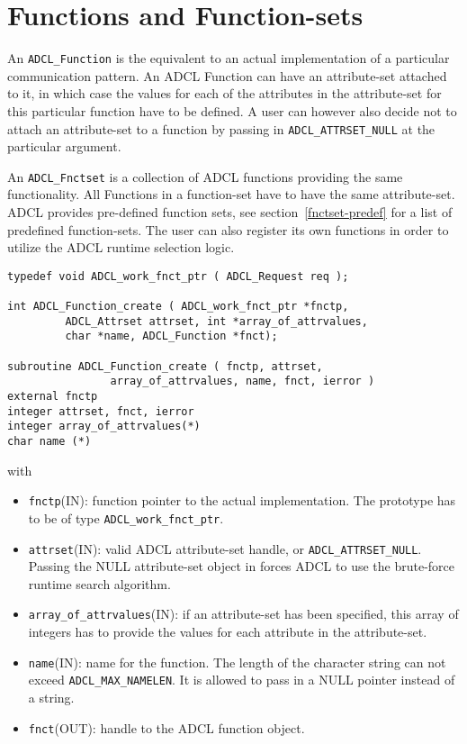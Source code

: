\section{Functions and Function-sets}

An {\tt ADCL\_Function} is the equivalent to an actual implementation of a
particular communication pattern. An ADCL Function can have an attribute-set
attached to it, in which case the values for each of the attributes in the
attribute-set for this particular function have to be defined. A user can
however also decide not to attach an attribute-set to a function by passing in
{\tt ADCL\_ATTRSET\_NULL} at the particular argument.

An {\tt ADCL\_Fnctset} is a collection of ADCL functions providing the same
functionality. All Functions in a function-set have to have the same
attribute-set. ADCL provides pre-defined function sets, see
section~\ref{fnctset-predef} for a list of predefined function-sets. The user
can also register its own functions in order to utilize the ADCL runtime
selection logic.

\begin{verbatim}
typedef void ADCL_work_fnct_ptr ( ADCL_Request req );

int ADCL_Function_create ( ADCL_work_fnct_ptr *fnctp, 
         ADCL_Attrset attrset, int *array_of_attrvalues,  
         char *name, ADCL_Function *fnct);

subroutine ADCL_Function_create ( fnctp, attrset, 
                array_of_attrvalues, name, fnct, ierror )
external fnctp
integer attrset, fnct, ierror
integer array_of_attrvalues(*)
char name (*)	                                

\end{verbatim}
with
\begin{itemize}
\item {\tt fnctp}(IN): function pointer to the actual implementation. The prototype has
     to be of type {\tt ADCL\_work\_fnct\_ptr}.
\item {\tt attrset}(IN): valid ADCL attribute-set handle, or {\tt ADCL\_ATTRSET\_NULL}. Passing the NULL attribute-set 
   object in forces ADCL to use the brute-force runtime search algorithm.
\item {\tt array\_of\_attrvalues}(IN): if an attribute-set has been specified, this array of
 integers has to provide the values for each attribute in the attribute-set. 
\item {\tt name}(IN): name for the function. The length of the character string can not exceed 
   {\tt ADCL\_MAX\_NAMELEN}. It is allowed to pass in a NULL pointer instead of a string.
\item {\tt fnct}(OUT): handle to the ADCL function object.
\end{itemize}

